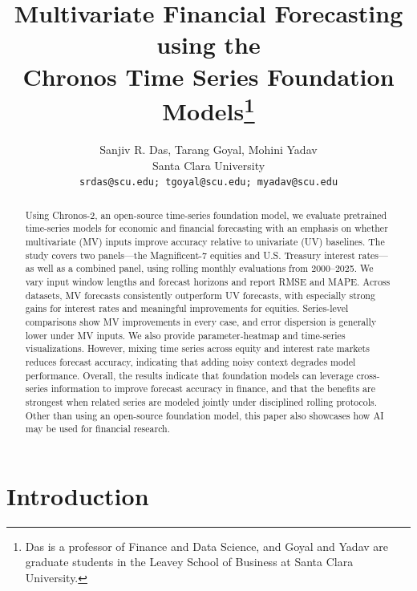 \documentclass[twocolumn]{article}
\begin{document}
\title{Multivariate Financial Forecasting using the \\Chronos Time Series Foundation Models\thanks{Das is a professor of Finance and Data Science, and Goyal and Yadav are graduate students in the Leavey School of Business at Santa Clara University.}}
\author{Sanjiv R. Das, Tarang Goyal, Mohini Yadav \\ Santa Clara University\\ \texttt{srdas@scu.edu; tgoyal@scu.edu; myadav@scu.edu}}


\maketitle


\begin{abstract}
Using Chronos-2, an open-source time-series foundation model, we evaluate pretrained time-series models for economic and financial forecasting with an emphasis on whether multivariate (MV) inputs improve accuracy relative to univariate (UV) baselines. The study covers two panels---the Magnificent-7 equities and U.S. Treasury interest rates---as well as a combined panel, using rolling monthly evaluations from 2000--2025. We vary input window lengths and forecast horizons and report RMSE and MAPE. Across datasets, MV forecasts consistently outperform UV forecasts, with especially strong gains for interest rates and meaningful improvements for equities. Series-level comparisons show MV improvements in every case, and error dispersion is generally lower under MV inputs. We also provide parameter-heatmap and time-series visualizations. However, mixing time series across equity and interest rate markets reduces forecast accuracy, indicating that adding noisy context degrades model performance. Overall, the results indicate that foundation models can leverage cross-series information to improve forecast accuracy in finance, and that the benefits are strongest when related series are modeled jointly under disciplined rolling protocols. Other than using an open-source foundation model, this paper also  showcases how AI may be used for financial research. 
\end{abstract}


\section{Introduction}
\end{document}
